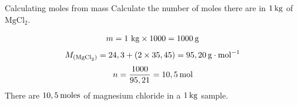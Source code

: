     \noindent
  \vspace{-.3cm}
            \label{m38717*secfhsst!!!underscore!!!id641}\vspace{.5cm}  
      \begin{wex}{Calculating moles from mass }
{
      \label{m38717*id278755}Calculate the number of moles there are in $1\phantom{\rule{2pt}{0ex}}\text{kg}$ of $\text{MgCl}{}_{2}$.
      \vspace{5pt}}
{


\label{m38717*id278854}\nopagebreak\noindent{}
    \begin{equation*}
    m=1~\text{kg}\ensuremath{\times}1 000=1 000\phantom{\rule{2pt}{0ex}}\text{g}
      \end{equation*}
\label{m38717*id278912}\nopagebreak\noindent{}
    \begin{equation*}
    {M}_{\left({\text{MgCl}}_{2}\right)}=24,3 + \left(2\ensuremath{\times}35,45\right) = 95,20\phantom{\rule{2pt}{0ex}}\text{g}\ensuremath{\cdot}{\text{mol}}^{-1}
      \end{equation*}    
      \label{m38717*id279005}\nopagebreak\noindent{}
    \begin{equation*}
    n=\frac{1000}{95,21}=10,5\phantom{\rule{2pt}{0ex}}\text{mol}
      \end{equation*}
      \label{m38717*id279046}There are $10,5\phantom{\rule{2pt}{0ex}}\text{moles}$ of magnesium chloride in a $1\phantom{\rule{2pt}{0ex}}\text{kg}$ sample.
}
    \end{wex}
\label{m38717*secfhsst!!!underscore!!!id832}
